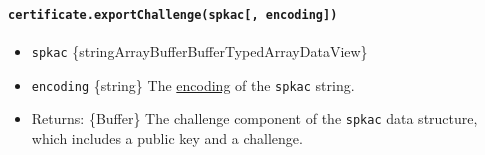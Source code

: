 \begin{Shaded}
\begin{Highlighting}[]
\OperatorTok{=} \NormalTok{(}\NormalTok{)}\OperatorTok{;}

\OperatorTok{=}  \NormalTok{()}\OperatorTok{;}
\OperatorTok{=} \NormalTok{()}\OperatorTok{;}
\end{Highlighting}
\end{Shaded}

\paragraph{\texorpdfstring{\texttt{certificate.exportChallenge(spkac{[},\ encoding{]})}}{certificate.exportChallenge(spkac{[}, encoding{]})}}\label{certificate.exportchallengespkac-encoding}

\begin{itemize}
\tightlist
\item
  \texttt{spkac}
  \{string\textbar ArrayBuffer\textbar Buffer\textbar TypedArray\textbar DataView\}
\item
  \texttt{encoding} \{string\} The
  \href{buffer.md\#buffers-and-character-encodings}{encoding} of the
  \texttt{spkac} string.
\item
  Returns: \{Buffer\} The challenge component of the \texttt{spkac} data
  structure, which includes a public key and a challenge.
\end{itemize}

\begin{Shaded}
\begin{Highlighting}[]
\OperatorTok{=}  \NormalTok{(}\NormalTok{)}\OperatorTok{;}
\OperatorTok{=} \NormalTok{()}\OperatorTok{;}
\OperatorTok{=} \NormalTok{()}\OperatorTok{;}
\OperatorTok{=}\OperatorTok{;}
\NormalTok{(}\NormalTok{))}\OperatorTok{;}
\end{Highlighting}
\end{Shaded}

